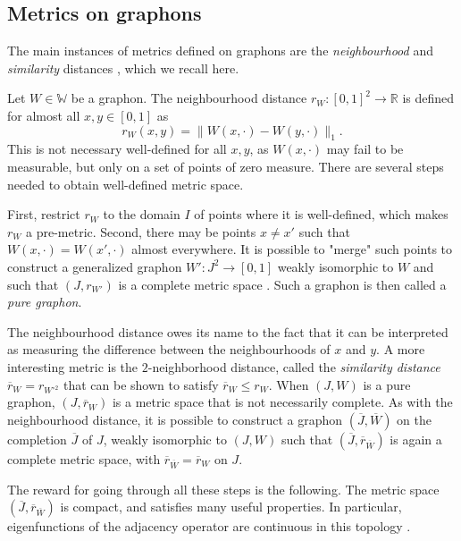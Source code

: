 \documentclass[11pt]{article}
\def\R{\mathbb{R}}
\def\WW{\mathbb{W}}
\theoremstyle{definition}
\begin{document}
\subsection{Metrics on graphons}\label{sec:graphon-metrics}

The main instances of metrics defined on graphons are the \textit{neighbourhood} and \textit{similarity} distances \cite{lovaszRegularityPartitionsTopology2010b,lovaszAutomorphismGroupGraphon2014b}, which we recall here.

Let $W \in \WW$ be a graphon. The neighbourhood distance $r_W : [0,1]^2 \rightarrow \R$ is defined for almost all $x,y\in [0,1]$ as
$$ r_W (x,y) = \| W(x,\cdot) - W(y,\cdot) \|_1. $$
This is not necessary well-defined for all $x,y$, as $W(x,\cdot)$ may fail to be measurable, but only on a set of points of zero measure. There are several steps needed to obtain well-defined metric space.

First, restrict $r_W$ to the domain $I$ of points where it is well-defined, which makes $r_W$ a pre-metric. Second, there may be points $x \neq x'$ such that $W(x,\cdot) = W(x',\cdot)$ almost everywhere. It is possible to "merge" such points to construct a generalized graphon $W': J^2 \rightarrow [0,1]$ weakly isomorphic to $W$ and such that $(J,r_{W'})$ is a complete metric space \cite{lovaszRegularityPartitionsTopology2010b}. Such a graphon is then called a \textit{pure graphon}.

The neighbourhood distance owes its name to the fact that it can be interpreted as measuring the difference between the neighbourhoods of $x$ and $y$. A more interesting metric is the $2$-neighborhood distance, called the \textit{similarity distance} $\overline{r}_W = r_{W^{\circ 2}}$ that can be shown to satisfy $\overline{r}_W \le r_W$. When $(J,W)$ is a pure graphon, $(J,\overline{r}_W)$ is a metric space that is not necessarily complete. As with the neighbourhood distance, it is possible to construct a graphon $(\overline{J},\overline{W})$ on the completion $\overline{J}$ of $J$, weakly isomorphic to $(J,W)$ such that $(\overline{J},\overline{r}_{\overline{W}} )$ is again a complete metric space, with $\overline{r}_{\overline{W}} = \overline{r}_W$ on $J$.

The reward for going through all these steps is the following. The metric space $(\overline{J}, \overline{r}_{\overline{W}})$ is compact, and satisfies many useful properties. In particular, eigenfunctions of the adjacency operator are continuous in this topology \cite{lovaszRegularityPartitionsTopology2010b}.
\end{document}
